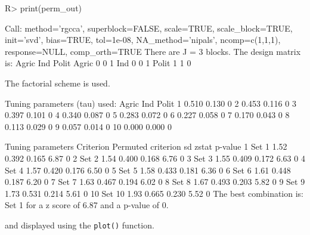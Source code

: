 \documentclass[
]{jss}
\begin{document}
\begin{CodeChunk}
\begin{CodeInput}
R> print(perm_out)
\end{CodeInput}
\begin{CodeOutput}
Call: method='rgcca', superblock=FALSE, scale=TRUE, scale_block=TRUE, init='svd',
bias=TRUE, tol=1e-08, NA_method='nipals', ncomp=c(1,1,1), response=NULL,
comp_orth=TRUE 
There are J = 3 blocks.
The design matrix is:
      Agric Ind Polit
Agric     0   0     1
Ind       0   0     1
Polit     1   1     0

The factorial scheme is used.

Tuning parameters (tau) used: 
   Agric   Ind Polit
1  0.510 0.130     0
2  0.453 0.116     0
3  0.397 0.101     0
4  0.340 0.087     0
5  0.283 0.072     0
6  0.227 0.058     0
7  0.170 0.043     0
8  0.113 0.029     0
9  0.057 0.014     0
10 0.000 0.000     0

   Tuning parameters Criterion Permuted criterion    sd zstat p-value
1              Set 1      1.52              0.392 0.165  6.87       0
2              Set 2      1.54              0.400 0.168  6.76       0
3              Set 3      1.55              0.409 0.172  6.63       0
4              Set 4      1.57              0.420 0.176  6.50       0
5              Set 5      1.58              0.433 0.181  6.36       0
6              Set 6      1.61              0.448 0.187  6.20       0
7              Set 7      1.63              0.467 0.194  6.02       0
8              Set 8      1.67              0.493 0.203  5.82       0
9              Set 9      1.73              0.531 0.214  5.61       0
10            Set 10      1.93              0.665 0.230  5.52       0
The best combination is: Set 1 for a z score of 6.87 and a p-value of 0.
\end{CodeOutput}
\end{CodeChunk}

\normalsize

and displayed using the \texttt{plot()} function.

\footnotesize
\end{document}

